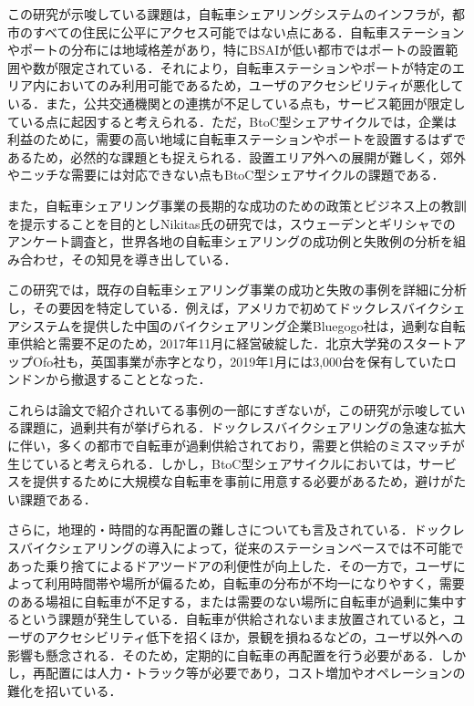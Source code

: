           \par この研究が示唆している課題は，自転車シェアリングシステムのインフラが，都市のすべての住民に公平にアクセス可能ではない点にある．自転車ステーションやポートの分布には地域格差があり，特にBSAIが低い都市ではポートの設置範囲や数が限定されている．それにより，自転車ステーションやポートが特定のエリア内においてのみ利用可能であるため，ユーザのアクセシビリティが悪化している．また，公共交通機関との連携が不足している点も，サービス範囲が限定している点に起因すると考えられる．ただ，BtoC型シェアサイクルでは，企業は利益のために，需要の高い地域に自転車ステーションやポートを設置するはずであるため，必然的な課題とも捉えられる．設置エリア外への展開が難しく，郊外やニッチな需要には対応できない点もBtoC型シェアサイクルの課題である．
          \par また，自転車シェアリング事業の長期的な成功のための政策とビジネス上の教訓を提示することを目的としNikitas氏の研究では，スウェーデンとギリシャでのアンケート調査と，世界各地の自転車シェアリングの成功例と失敗例の分析を組み合わせ，その知見を導き出している．
          \par この研究では，既存の自転車シェアリング事業の成功と失敗の事例を詳細に分析し，その要因を特定している．例えば，アメリカで初めてドックレスバイクシェアシステムを提供した中国のバイクシェアリング企業Bluegogo社は，過剰な自転車供給と需要不足のため，2017年11月に経営破綻した．北京大学発のスタートアップOfo社も，英国事業が赤字となり，2019年1月には3,000台を保有していたロンドンから撤退することとなった．
          \par これらは論文で紹介されいてる事例の一部にすぎないが，この研究が示唆している課題に，過剰共有が挙げられる．ドックレスバイクシェアリングの急速な拡大に伴い，多くの都市で自転車が過剰供給されており，需要と供給のミスマッチが生じていると考えられる．しかし，BtoC型シェアサイクルにおいては，サービスを提供するために大規模な自転車を事前に用意する必要があるため，避けがたい課題である．
          \par さらに，地理的・時間的な再配置の難しさについても言及されている．ドックレスバイクシェアリングの導入によって，従来のステーションベースでは不可能であった乗り捨てによるドアツードアの利便性が向上した．その一方で，ユーザによって利用時間帯や場所が偏るため，自転車の分布が不均一になりやすく，需要のある場祖に自転車が不足する，または需要のない場所に自転車が過剰に集中するという課題が発生している．自転車が供給されないまま放置されていると，ユーザのアクセシビリティ低下を招くほか，景観を損ねるなどの，ユーザ以外への影響も懸念される．そのため，定期的に自転車の再配置を行う必要がある．しかし，再配置には人力・トラック等が必要であり，コスト増加やオペレーションの難化を招いている．
          
